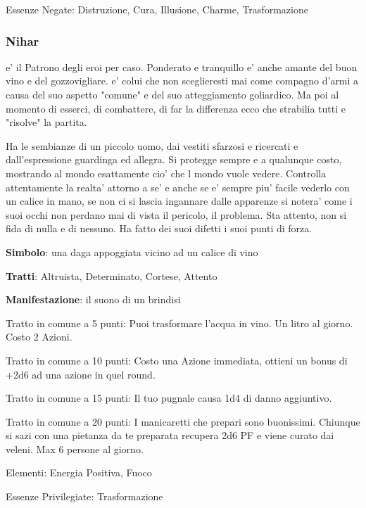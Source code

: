 \documentclass[a4paper,11pt,twoside,openany]{dndbook}
\begin{document}
{Essenze Negate: Distruzione, Cura, Illusione, Charme, Trasformazione

\subsubsection{Nihar}

\label{nihar}

e' il Patrono degli eroi per caso. Ponderato e tranquillo e' anche amante del buon vino e del gozzovigliare. e' colui che non sceglieresti mai come compagno d'armi a causa del suo aspetto "comune" e del suo atteggiamento goliardico. Ma poi al momento di esserci, di combattere, di far la differenza ecco che strabilia tutti e "risolve" la partita.

Ha le sembianze di un piccolo uomo, dai vestiti sfarzosi e ricercati e dall'espressione guardinga ed allegra. Si protegge sempre e a qualunque costo, mostrando al mondo esattamente cio' che l mondo vuole vedere. Controlla attentamente la realta' attorno a se' e anche se e' sempre piu' facile vederlo con un calice in mano, se non ci si lascia ingannare dalle apparenze si notera' come i suoi occhi non perdano mai di vista il pericolo, il problema. Sta attento, non si fida di nulla e di nessuno. Ha fatto dei suoi difetti i suoi punti di forza.

\textbf{Simbolo}: una daga appoggiata vicino ad un calice di vino

\textbf{Tratti}: Altruista, Determinato, Cortese, Attento

\textbf{Manifestazione}: il suono di un brindisi

\bigskip

Tratto in comune a 5 punti: Puoi trasformare l'acqua in vino. Un litro al giorno. Costo 2 Azioni.

Tratto in comune a 10 punti: Costo una Azione immediata, ottieni un bonus di +2d6 ad una azione in quel round.

Tratto in comune a 15 punti: Il tuo pugnale causa 1d4 di danno aggiuntivo.

Tratto in comune a 20 punti: I manicaretti che prepari sono buonissimi. Chiunque si sazi con una pietanza da te preparata recupera 2d6 PF e viene curato dai veleni. Max 6 persone al giorno.

\bigskip

Elementi: Energia Positiva, Fuoco

\bigskip

Essenze Privilegiate: Trasformazione

}
\end{document}

